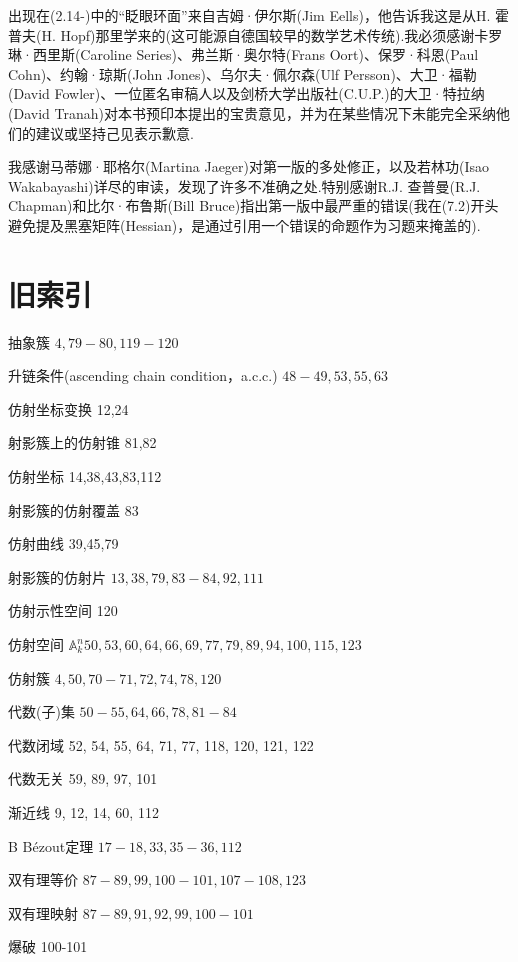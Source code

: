 出现在(2.14-)中的“眨眼环面”来自吉姆·伊尔斯(Jim Eells)，他告诉我这是从H. 霍普夫(H. Hopf)那里学来的(这可能源自德国较早的数学艺术传统).我必须感谢卡罗琳·西里斯(Caroline Series)、弗兰斯·奥尔特(Frans Oort)、保罗·科恩(Paul Cohn)、约翰·琼斯(John Jones)、乌尔夫·佩尔森(Ulf Persson)、大卫·福勒(David Fowler)、一位匿名审稿人以及剑桥大学出版社(C.U.P.)的大卫·特拉纳(David Tranah)对本书预印本提出的宝贵意见，并为在某些情况下未能完全采纳他们的建议或坚持己见表示歉意.

我感谢马蒂娜·耶格尔(Martina Jaeger)对第一版的多处修正，以及若林功(Isao Wakabayashi)详尽的审读，发现了许多不准确之处.特别感谢R.J. 查普曼(R.J. Chapman)和比尔·布鲁斯(Bill Bruce)指出第一版中最严重的错误(我在(7.2)开头避免提及黑塞矩阵(Hessian)，是通过引用一个错误的命题作为习题来掩盖的).

\section{旧索引}

抽象簇 \(4,{79} - {80},{119} - {120}\)

升链条件(ascending chain condition，a.c.c.) \({48} - {49},{53},{55},{63}\)

仿射坐标变换 12,24

射影簇上的仿射锥 81,82

仿射坐标 14,38,43,83,112

射影簇的仿射覆盖 83

仿射曲线 39,45,79

射影簇的仿射片 \({13},{38},{79},{83} - {84},{92},{111}\)

仿射示性空间 120

仿射空间 \({\mathbb{A}}_{k}^{n}{50},{53},{60},{64},{66},{69},{77},{79},{89},{94},{100},{115},{123}\)

仿射簇 \(4,{50},{70} - {71},{72},{74},{78},{120}\)

代数(子)集 \({50} - {55},{64},{66},{78},{81} - {84}\)

代数闭域 52, 54, 55, 64, 71, 77, 118, 120, 121, 122

代数无关 59, 89, 97, 101

渐近线 9, 12, 14, 60, 112

B Bézout定理 \({17} - {18},{33},{35} - {36},{112}\)

双有理等价 \({87} - {89},{99},{100} - {101},{107} - {108},{123}\)

双有理映射 \({87} - {89},{91},{92},{99},{100} - {101}\)

爆破 100-101

